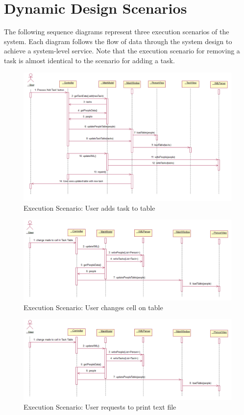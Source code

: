 \documentclass[12pt]{article}
\begin{document}
\section{Dynamic Design Scenarios}

The following sequence diagrams represent three execution scenarios of the system. Each diagram follows the flow of data through the system design to achieve a system-level service. Note that the execution scenario for removing a task is almost identical to the scenario for adding a task.

\begin{figure}[htbp]
\begin{center} \includegraphics[scale=.55]{Diagrams/add_task_diagram.png} \end{center}
\caption{Execution Scenario: User adds task to table}
\label{fig:add-task-diagram}
\end{figure}

\begin{figure}[htbp]
\begin{center} \includegraphics[scale=.55]{Diagrams/change_cell_diagram.png} \end{center}
\caption{Execution Scenario: User changes cell on table}
\label{fig:change-cell-diagram}
\end{figure}

\begin{figure}[htbp]
\begin{center} \includegraphics[scale=.55]{Diagrams/change_cell_diagram.png} \end{center}
\caption{Execution Scenario: User requests to print text file}
\label{fig:print-text-diagram}
\end{figure}
\end{document}
